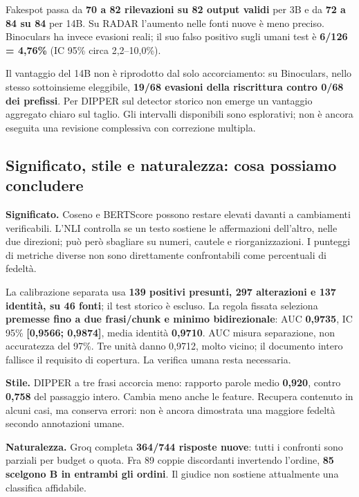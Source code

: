 Fakespot passa da \textbf{70 a 82 rilevazioni su 82 output validi} per 3B e da \textbf{72 a 84 su 84} per 14B. Su RADAR l'aumento nelle fonti nuove è meno preciso. Binoculars ha invece evasioni reali; il suo falso positivo sugli umani test è \textbf{6/126 = 4,76\%} (IC 95\% circa 2,2--10,0\%).

Il vantaggio del 14B non è riprodotto dal solo accorciamento: su Binoculars, nello stesso sottoinsieme eleggibile, \textbf{19/68 evasioni della riscrittura contro 0/68 dei prefissi}. Per DIPPER sul detector storico non emerge un vantaggio aggregato chiaro sul taglio. Gli intervalli disponibili sono esplorativi; non è ancora eseguita una revisione complessiva con correzione multipla.

\newpage

\subsection{Significato, stile e naturalezza: cosa possiamo concludere}\label{significato-stile-e-naturalezza-cosa-possiamo-concludere}

\textbf{Significato.} Coseno e BERTScore possono restare elevati davanti a cambiamenti verificabili. L'NLI controlla se un testo sostiene le affermazioni dell'altro, nelle due direzioni; può però sbagliare su numeri, cautele e riorganizzazioni. I punteggi di metriche diverse non sono direttamente confrontabili come percentuali di fedeltà.

La calibrazione separata usa \textbf{139 positivi presunti, 297 alterazioni e 137 identità, su 46 fonti}; il test storico è escluso. La regola fissata seleziona \textbf{premesse fino a due frasi/chunk e minimo bidirezionale}: AUC \textbf{0,9735}, IC 95\% \textbf{{[}0,9566; 0,9874{]}}, media identità \textbf{0,9710}. AUC misura separazione, non accuratezza del 97\%. Tre unità danno 0,9712, molto vicino; il documento intero fallisce il requisito di copertura. La verifica umana resta necessaria.

\textbf{Stile.} DIPPER a tre frasi accorcia meno: rapporto parole medio \textbf{0,920}, contro \textbf{0,758} del passaggio intero. Cambia meno anche le feature. Recupera contenuto in alcuni casi, ma conserva errori: non è ancora dimostrata una maggiore fedeltà secondo annotazioni umane.

\textbf{Naturalezza.} Groq completa \textbf{364/744 risposte nuove}: tutti i confronti sono parziali per budget o quota. Fra 89 coppie discordanti invertendo l'ordine, \textbf{85 scelgono B in entrambi gli ordini}. Il giudice non sostiene attualmente una classifica affidabile.

